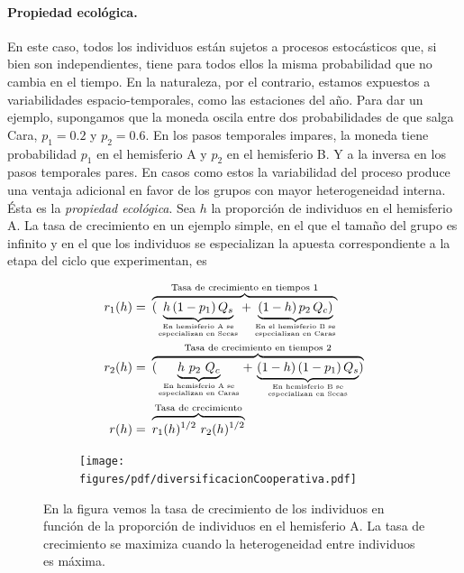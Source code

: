 \documentclass[a4paper,11pt]{book}
\newcommand\hfrac[2]{\genfrac{}{}{0pt}{}{#1}{#2}} %
\theoremstyle{definition}
\begin{document}
\paragraph{Propiedad ecológica.}
En este caso, todos los individuos están sujetos a procesos estocásticos que, si bien son independientes, tiene para todos ellos la misma probabilidad que no cambia en el tiempo.
%
En la naturaleza, por el contrario, estamos expuestos a variabilidades espacio-temporales, como las estaciones del año.
%
Para dar un ejemplo, supongamos que la moneda oscila entre dos probabilidades de que salga Cara, $p_1 = 0.2$ y $p_2 = 0.6$.
%
En los pasos temporales impares, la moneda tiene probabilidad $p_1$ en el hemisferio A y $p_2$ en el hemisferio B.
%
Y a la inversa en los pasos temporales pares.
%
En casos como estos la variabilidad del proceso produce una ventaja adicional en favor de los grupos con mayor heterogeneidad interna.
%
Ésta es la \emph{propiedad ecológica}.
%
Sea $h$ la proporción de individuos en el hemisferio A.
%
La tasa de crecimiento en un ejemplo simple, en el que el tamaño del grupo es infinito y en el que los individuos se especializan la apuesta correspondiente a la etapa del ciclo que experimentan, es
%
\begin{figure}[ht!]
\vspace{0cm}
\centering
 \begin{subfigure}[c]{0.44\textwidth}
 \begin{align*}
 r_{1}(h) = & \  \overbrace{(\underbrace{h \, (1-p_1) \, Q_s}_{\hfrac{\text{En hemisferio A se}}{\text{especializan en Secas}}} + \underbrace{(1-h) \, p_2 \, Q_c )}_{\hfrac{\text{En el hemisferio B se}}{\text{especializan en Caras}}} }^{\text{Tasa de crecimiento en tiempos 1}} \\
 r_{2}(h) = & \ \overbrace{ (\underbrace{h \ p_2 \ Q_c}_{\hfrac{\text{En  hemisferio A se}}{\text{especializan en Caras}}} + \, \underbrace{(1-h) \, (1-p_1) \, Q_s}_{\hfrac{\text{En  hemisferio B se}}{\text{especializan en Secas}}} )}^{\text{Tasa de crecimiento en tiempos 2}} \\
 r(h) = & \ \overbrace{r_{1}(h)^{1/2} \ r_2(h)^{1/2}}^{\text{Tasa de crecimiento}}
\end{align*}
 \end{subfigure}
 \hspace{0.2cm}
  \begin{subfigure}[c]{0.44\textwidth}
\begin{flushright}
 \texttt{[image: figures/pdf/diversificacionCooperativa.pdf]}
 \end{flushright}
 \end{subfigure}
 \caption{
 En la figura vemos la tasa de crecimiento de los individuos en función de la proporción de individuos en el hemisferio A. La tasa de crecimiento se maximiza cuando la heterogeneidad entre individuos es máxima.
 }
 \label{fig:divCoop}
 \vspace{-0.1cm}
 \end{figure}
\end{document}

